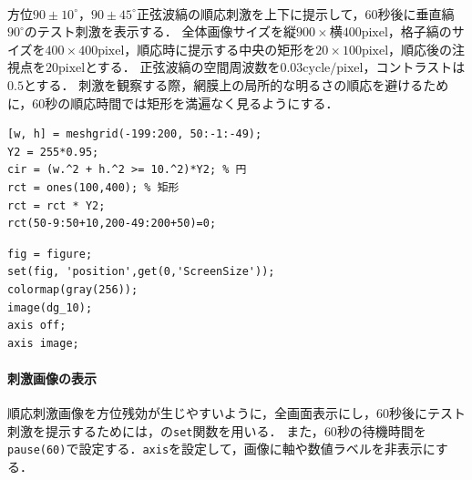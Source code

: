\paragraph{\kadaicb}
方位\(90\pm 10^\circ\)，\(90\pm 45^\circ\)正弦波縞の順応刺激を上下に提示して，\(60\)秒後に垂直縞\(90^\circ\)のテスト刺激を表示する．
全体画像サイズを\(\textrm{縦}900\times\textrm{横}400\textrm{pixel}\)，格子縞のサイズを\(400\times 400\textrm{pixel}\)，順応時に提示する中央の矩形を\(20\times 100\textrm{pixel}\)，順応後の注視点を\(20\textrm{pixel}\)とする．
正弦波縞の空間周波数を\(0.03\textrm{cycle}/\textrm{pixel}\)，コントラストは\(0.5\)とする．
刺激を観察する際，網膜上の局所的な明るさの順応を避けるために，\(60\)秒の順応時間では矩形を満遍なく見るようにする．
\begin{center}
    \begin{minipage}[t]{.48\textwidth}
        \begin{lstlisting}[caption={矩形と円の作成},label={src:矩形と円の作成}]
[w, h] = meshgrid(-199:200, 50:-1:-49);
Y2 = 255*0.95;
cir = (w.^2 + h.^2 >= 10.^2)*Y2; % 円
rct = ones(100,400); % 矩形
rct = rct * Y2;
rct(50-9:50+10,200-49:200+50)=0;
        \end{lstlisting}
    \end{minipage}
    \hspace{.5em}
    \begin{minipage}[t]{.48\textwidth}
        \begin{lstlisting}[caption={刺激画像の表示方法},label={src:刺激画像の表示方法}]
fig = figure;
set(fig, 'position',get(0,'ScreenSize'));
colormap(gray(256));
image(dg_10);
axis off;
axis image;    
    \end{lstlisting}
    \end{minipage}
    \vspace{-.5em}
\end{center}
\newpage
\paragraph{刺激画像の表示}
順応刺激画像を方位残効が生じやすいように，全画面表示にし，\(60\)秒後にテスト刺激を提示するためには，\matlab の\texttt{set}関数を用いる．
また，\(60\)秒の待機時間を\texttt{pause(60)}で設定する．\texttt{axis}を設定して，画像に軸や数値ラベルを非表示にする．
